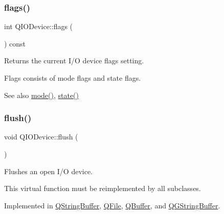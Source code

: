 \mbox{\label{class_q_i_o_device_a3c3dd3eed081ff824acb10fa0eba9d91}} 
\subsubsection{\texorpdfstring{flags()}{flags()}}
{\footnotesize\ttfamily int Q\+I\+O\+Device\+::flags (\begin{DoxyParamCaption}{ }\end{DoxyParamCaption}) const\hspace{0.3cm}{\ttfamily [inline]}}

Returns the current I/O device flags setting.

Flags consists of mode flags and state flags.

\begin{DoxySeeAlso}{See also}
\mbox{\hyperlink{class_q_i_o_device_ad2a025933d4c1fc013f7c7f7ce2601ab}{mode()}}, \mbox{\hyperlink{class_q_i_o_device_a8529428353a81543a5a460797bf01c21}{state()}} 
\end{DoxySeeAlso}
\mbox{\label{class_q_i_o_device_a39eccb592ae076fbc42108a3d590fb43}} 
\subsubsection{\texorpdfstring{flush()}{flush()}}
{\footnotesize\ttfamily void Q\+I\+O\+Device\+::flush (\begin{DoxyParamCaption}{ }\end{DoxyParamCaption})\hspace{0.3cm}{\ttfamily [pure virtual]}}

Flushes an open I/O device.

This virtual function must be reimplemented by all subclasses. 

Implemented in \mbox{\hyperlink{class_q_string_buffer_a2961ddd6de68bb9e681ae8e18b6b298b}{Q\+String\+Buffer}}, \mbox{\hyperlink{class_q_file_a6d450a55bc3a8145fd33a7ee08051830}{Q\+File}}, \mbox{\hyperlink{class_q_buffer_a5e16941f9973d0263ea1ef79b54bc88f}{Q\+Buffer}}, and \mbox{\hyperlink{class_q_g_string_buffer_a655d2990426c9a646fc4d14273fb89c0}{Q\+G\+String\+Buffer}}.

\mbox{\label{class_q_i_o_device_a7cef61d66023f9cda6b0912082bd19fc}} 
